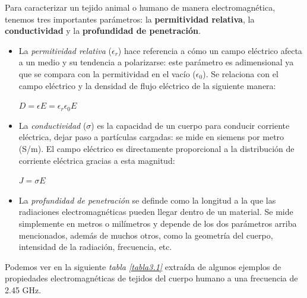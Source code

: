 Para caracterizar un tejido animal o humano de manera electromagnética, tenemos tres importantes parámetros: la \textbf{permitividad relativa}, la \textbf{conductividad} y la \textbf{profundidad de penetración}.

\begin{itemize}
    \item La \textit{permitividad relativa} ($\epsilon_{r}$) hace referencia a cómo un campo eléctrico afecta a un medio y su tendencia a polarizarse: este parámetro es adimensional ya que se compara con la permitividad en el vacío ($\epsilon_{0}$). Se relaciona con el campo eléctrico y la densidad de flujo eléctrico de la siguiente manera:
    \begin{center}
        $D =  \epsilon E = \epsilon_{r}\epsilon_{0} E$
    \end{center}

    \item La \textit{conductividad} ($\sigma$) es la capacidad de un cuerpo para conducir corriente eléctrica, dejar paso a partículas cargadas: se mide en siemens por metro (S/m). El campo eléctrico es directamente proporcional a la distribución de corriente eléctrica gracias a esta magnitud:
    \begin{center}
        $J = \sigma E$
    \end{center}

    \item La \textit{profundidad de penetración} se definde como la longitud a la que las radiaciones electromagnéticas pueden llegar dentro de un material. Se mide simplemente en metros o milímetros y depende de los dos parámetros arriba mencionados, además de muchos otros, como la geometría del cuerpo, intensidad de la radiación, frecuencia, etc.
\end{itemize}

Podemos ver en la siguiente \textit{tabla \ref{tabla3.1}} extraída de \cite{yangtabla} algunos ejemplos de propiedades electromagnéticas de tejidos del cuerpo humano a una frecuencia de 2.45 GHz.

